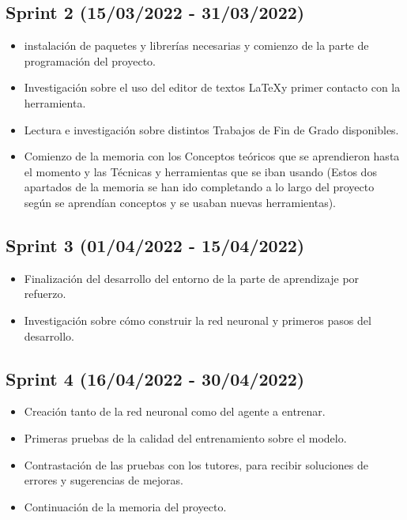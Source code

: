 \subsection{Sprint 2 (15/03/2022 - 31/03/2022)}
\begin{itemize}
    \item instalación de paquetes y librerías necesarias y comienzo de la parte de programación del proyecto.
    \item Investigación sobre el uso del editor de textos \LaTeX y primer contacto con la herramienta.
    \item Lectura e investigación sobre distintos Trabajos de Fin de Grado disponibles.
    \item Comienzo de la memoria con los Conceptos teóricos que se aprendieron hasta el momento y las Técnicas y herramientas que se iban usando (Estos dos apartados de la memoria se han ido completando a lo largo del proyecto según se aprendían conceptos y se usaban nuevas herramientas).
\end{itemize}

\subsection{Sprint 3 (01/04/2022 - 15/04/2022)}
\begin{itemize}
    \item Finalización del desarrollo del entorno de la parte de aprendizaje por refuerzo.
    \item Investigación sobre cómo construir la red neuronal y primeros pasos del desarrollo.
\end{itemize}

\subsection{Sprint 4 (16/04/2022 - 30/04/2022)}
\begin{itemize}
    \item Creación tanto de la red neuronal como del agente a entrenar.
    \item Primeras pruebas de la calidad del entrenamiento sobre el modelo.
    \item Contrastación de las pruebas con los tutores, para recibir soluciones de errores y sugerencias de mejoras.
    \item Continuación de la memoria del proyecto.
\end{itemize}

